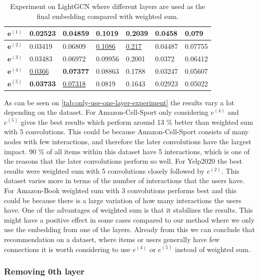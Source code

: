 \begin{table}[]
\begin{tabular}{|l|l|l|l|l|l|l|}
        $\mathbf{e}^{(1)}$   & 0.02523                                & 0.04859                       & 0.1019                           & 0.2039            & 0.0458              & 0.079               \\ \hline
        $\mathbf{e}^{(2)}$   & 0.03419                                & 0.06809                       & \underline{0.1086}               & \underline{0.217} & 0.04487             & 0.07755             \\ \hline
        $\mathbf{e}^{(3)}$   & 0.03483                                & 0.06972                       & 0.09956                          & 0.2001            & 0.0372              & 0.06412             \\ \hline
        $\mathbf{e}^{(4)}$   & \underline{0.0366}                     & \textbf{0.07377}              & 0.08863                          & 0.1788            & 0.03247             & 0.05607             \\ \hline
        $\mathbf{e}^{(5)}$   & \textbf{0.03733}                       & \underline{0.07318}           & 0.0819                           & 0.1643            & 0.02923             & 0.05022             \\ \hline
    \end{tabular}
    \centering
    \caption{Experiment on LightGCN where different layers are used as the final embedding compared with weighted sum.}
    \label{tab:only-use-one-layer-experiment}
\end{table}

As can be seen on \autoref{tab:only-use-one-layer-experiment} the results vary a lot depending on the dataset.
For Amazon-Cell-Sport only considering $e^{(4)}$ and $e^{(5)}$ gives the best results which perform around 13 \% better than weighted sum with 5 convolutions.
This could be because Amazon-Cell-Sport consists of many nodes with few interactions, and therefore the later convolutions have the largest impact. 90 \% of all items within this dataset have 5 interactions, which is one of the reasons that the later convolutions perform so well.
For Yelp2020 the best results were weighted sum with 5 convolutions closely followed by $e^{(2)}$.
This dataset varies more in terms of the number of interactions that the users have.
For Amazon-Book weighted sum with 3 convolutions performs best and this could be because there is a large variation of how many interactions the users have.
One of the advantages of weighted sum is that it stabilizes the results.
This might have a positive effect in some cases compared to our method where we only use the embedding from one of the layers.
Already from this we can conclude that recommendation on a dataset, where items or users generally have few connections it is worth considering to use $e^{(4)}$ or $e^{(5)}$ instead of weighted sum.

\subsubsection{Removing 0th layer}
